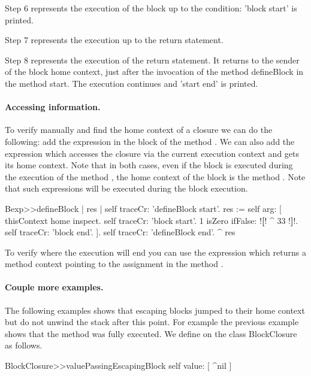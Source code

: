 \documentclass[a4paper,10pt,twoside]{book}
\begin{document}
Step 6 represents the execution of the block up to the condition: 'block start' is printed.

Step 7 represents the execution up to the return statement.

Step 8 represents the execution of the return statement. It returns to the sender of the block home context, \ie just after the invocation of the method defineBlock in the method start. The execution continues and 'start end' is printed.




\paragraph{Accessing information.}
To verify manually and find the home context of a closure we can do the following: add the expression  in the block of the  method . We can also add the expression  which accesses the closure via the current execution context and gets its home context. Note that in both cases, even if the block is executed during the execution of the method , the home context of the block is the method .
Note that such expressions will be executed during the block execution.

\begin{code}{}
Bexp>>defineBlock
	| res |
	self traceCr: 'defineBlock start'.
	res := self arg: [ thisContext home inspect. self traceCr: 'block start'.
                            1 isZero ifFalse: !\textbf{[}! ^ 33 !\textbf{]}!.
                            self traceCr: 'block end'. ].
	self traceCr: 'defineBlock end'.
	^ res
\end{code}

To verify where the execution will end you can use the expression  which returns a method context pointing to the assignment in the method .

\paragraph{Couple more examples.}
The following examples shows that escaping blocks jumped to their home context but do not unwind the stack after this point. For example the previous example shows that the method  was fully executed.
We define  on the class BlockClosure as follows.

\begin{code}{}
BlockClosure>>valuePassingEscapingBlock
	  self value: [ ^nil ]
\end{code}
\end{document}
